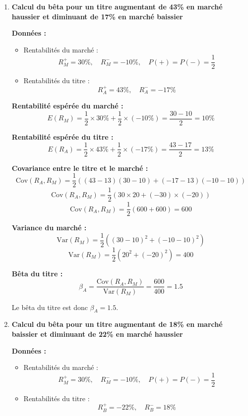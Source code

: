 \documentclass[a4paper, 12pt]{report}
\begin{document}
\begin{enumerate}
	\item \textbf{Calcul du bêta pour un titre augmentant de 43\% en marché haussier et diminuant de 17\% en marché baissier}
	
	\textbf{Données :}
	
	\begin{itemize}
		\item Rentabilités du marché : 
		\[
		R_M^+ = 30\%, \quad R_M^- = -10\%, \quad P(+) = P(-) = \frac{1}{2}
		\]
		\item Rentabilités du titre : 
		\[
		R_A^+ = 43\%, \quad R_A^- = -17\%
		\]
	\end{itemize}
	
	\textbf{Rentabilité espérée du marché :}
	\[
	E(R_M) = \frac{1}{2} \times 30\% + \frac{1}{2} \times (-10\%) = \frac{30 - 10}{2} = 10\%
	\]
	
	\textbf{Rentabilité espérée du titre :}
	\[
	E(R_A) = \frac{1}{2} \times 43\% + \frac{1}{2} \times (-17\%) = \frac{43 - 17}{2} = 13\%
	\]
	
	\textbf{Covariance entre le titre et le marché :}
	\[
	\text{Cov}(R_A, R_M) = \frac{1}{2} \left( (43 - 13)(30 - 10) + (-17 - 13)(-10 - 10) \right)
	\]
	\[
	\text{Cov}(R_A, R_M) = \frac{1}{2} \left( 30 \times 20 + (-30) \times (-20) \right)
	\]
	\[
	\text{Cov}(R_A, R_M) = \frac{1}{2} (600 + 600) = 600
	\]
	
	\textbf{Variance du marché :}
	\[
	\text{Var}(R_M) = \frac{1}{2} \left( (30 - 10)^2 + (-10 - 10)^2 \right)
	\]
	\[
	\text{Var}(R_M) = \frac{1}{2} \left( 20^2 + (-20)^2 \right) = 400
	\]
	
	\textbf{Bêta du titre :}
	\[
	\beta_A = \frac{\text{Cov}(R_A, R_M)}{\text{Var}(R_M)} = \frac{600}{400} = 1.5
	\]
	
	Le bêta du titre est donc \( \beta_A = 1.5 \).
	
	\item \textbf{Calcul du bêta pour un titre augmentant de 18\% en marché baissier et diminuant de 22\% en marché haussier}
	
	\textbf{Données :}
	
	\begin{itemize}
		\item Rentabilités du marché :
		\[
		R_M^+ = 30\%, \quad R_M^- = -10\%, \quad P(+) = P(-) = \frac{1}{2}
		\]
		\item Rentabilités du titre :
		\[
		R_B^+ = -22\%, \quad R_B^- = 18\%
		\]
	\end{itemize}
	

\end{enumerate}
\end{document}
